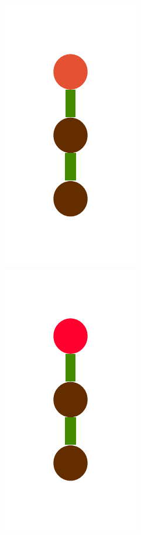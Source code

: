 \documentclass[a4paper,10pt]{article}
\begin{document}
\begin{figure}[t]
\centering
\includegraphics[scale=.26]{../figures/vector/4-2-4-constructor-induction-pre-0.pdf}
\includegraphics[scale=.26]{../figures/vector/4-2-4-constructor-induction-pre-1.pdf}

\end{figure}
\end{document}
